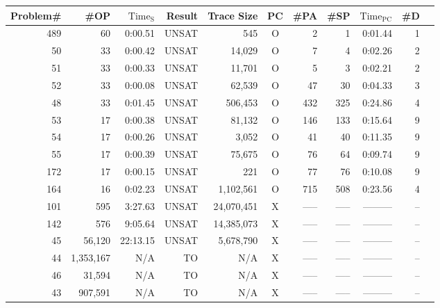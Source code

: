 \begin{table}[h]
  \begin{center}
    \begin{tabular}{|r||r|r|r||r||c|r|r|r|r|r|}
      \hline
      Problem\#&  \#OP  & $\mathrm{Time_S}$&    Result&     Trace Size& PC&  \#PA& \#SP& $\mathrm{Time_{PC}}$ & \#D\\
      \hline
      \hline
      489&       60&   0:00.51&     UNSAT&            545&O&    2&    1& 0:01.44& 1\\
      \hline
       50&       33&   0:00.42&     UNSAT&         14,029&O&    7&    4& 0:02.26& 2\\
      \hline
       51&       33&   0:00.33&     UNSAT&         11,701&O&    5&    3& 0:02.21& 2\\
      \hline
       52&       33&   0:00.08&     UNSAT&         62,539&O&   47&   30& 0:04.33& 3\\
      \hline
       48&       33&   0:01.45&     UNSAT&        506,453&O&  432&  325& 0:24.86& 4\\
      \hline
       53&       17&   0:00.38&     UNSAT&         81,132&O&  146&  133& 0:15.64& 9\\
      \hline
       54&       17&   0:00.26&     UNSAT&          3,052&O&   41&   40& 0:11.35& 9\\
      \hline
       55&       17&   0:00.39&     UNSAT&         75,675&O&   76&   64& 0:09.74& 9\\
      \hline
      172&       17&   0:00.15&     UNSAT&            221&O&   77&   76& 0:10.08& 9\\
      \hline
      164&       16&   0:02.23&     UNSAT&      1,102,561&O&  715&  508& 0:23.56& 4\\
      \hline
      \hline
      101&      595&   3:27.63&     UNSAT&     24,070,451&X&  -----& -----& --------- & --\\
      \hline
      142&      576&   9:05.64&     UNSAT&     14,385,073&X&  -----& -----& --------- & --\\
      \hline
       45&   56,120&  22:13.15&     UNSAT&      5,678,790&X&  -----& -----& --------- & --\\
      \hline
      \hline
       44&1,353,167&       N/A&       TO&             N/A&X&  -----& -----& --------- & --\\
      \hline
       46&   31,594&       N/A&       TO&             N/A&X&  -----& -----& --------- & --\\
      \hline
       43&  907,591&       N/A&       TO&             N/A&X&  -----& -----& --------- & --\\

\end{tabular}
\end{center}
\end{table}
